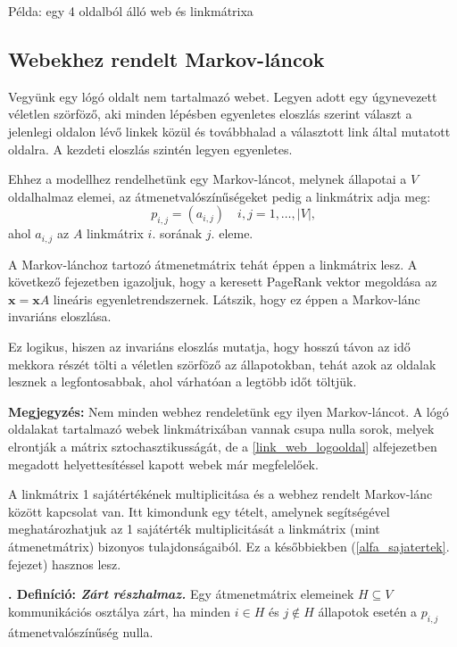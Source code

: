 \documentclass[12pt,a4paper]{article}
\newcounter{definicioszam}
\newenvironment{definicio}[1]
{{\medskip}\noindent \stepcounter{definicioszam}
{\bfseries{\thedefinicioszam. Definíció: \textit{#1.}}}}{\bigskip }
\newcommand{\bx}{\mathbf{x}}
\begin{document}
\bigskip
\centerline{Példa: egy 4 oldalból álló web és linkmátrixa}
\bigskip

\subsection{Webekhez rendelt Markov-láncok}\label{markov_lancok}

Vegyünk egy lógó oldalt nem tartalmazó webet. Legyen adott egy úgynevezett véletlen szörföző, aki minden lépésben egyenletes eloszlás szerint választ a jelenlegi oldalon lévő linkek közül és továbbhalad a választott link által mutatott oldalra. A kezdeti eloszlás szintén legyen egyenletes.

Ehhez a modellhez rendelhetünk egy Markov-láncot, melynek állapotai a $V$ oldalhalmaz elemei, az átmenetvalószínűségeket pedig a linkmátrix adja meg:
 \[ p_{i,j} = (a_{i,j}) \quad i,j = 1,\ldots,|V| \text{,} \]
ahol $a_{i,j}$ az $A$ linkmátrix $i$. sorának $j$. eleme.

A Markov-lánchoz tartozó átmenetmátrix tehát éppen a linkmátrix lesz. A következő fejezetben igazoljuk, hogy a keresett PageRank vektor megoldása az $\bx = \bx A$ lineáris egyenletrendszernek. Látszik, hogy ez éppen a Markov-lánc invariáns eloszlása.

Ez logikus, hiszen az invariáns eloszlás mutatja, hogy hosszú távon az idő mekkora részét tölti a véletlen szörföző az állapotokban, tehát azok az oldalak lesznek a legfontosabbak, ahol várhatóan a legtöbb időt töltjük.

\vspace{0.1cm}
\textbf{Megjegyzés:} Nem minden webhez rendeletünk egy ilyen Markov-láncot. A lógó oldalakat tartalmazó webek linkmátrixában vannak csupa nulla sorok, melyek elrontják a mátrix sztochasztikusságát, de a \ref{link_web_logooldal} alfejezetben megadott helyettesítéssel kapott webek már megfelelőek. 
\vspace{0.1cm}

A linkmátrix 1 sajátértékének multiplicitása és a webhez rendelt Markov-lánc között kapcsolat van. Itt kimondunk egy tételt, amelynek segítségével meghatározhatjuk az 1 sajátérték multiplicitását a linkmátrix (mint átmenetmátrix) bizonyos tulajdonságaiból. Ez a későbbiekben (\ref{alfa_sajatertek}. fejezet) hasznos lesz. 

\begin{definicio}{Zárt részhalmaz}
	Egy átmenetmátrix elemeinek $H \subseteq V$ kommunikációs osztálya zárt, ha minden $i \in H$ és $j \notin H$ állapotok esetén a $p_{i,j}$ átmenetvalószínűség nulla.  
\end{definicio}
\end{document}

